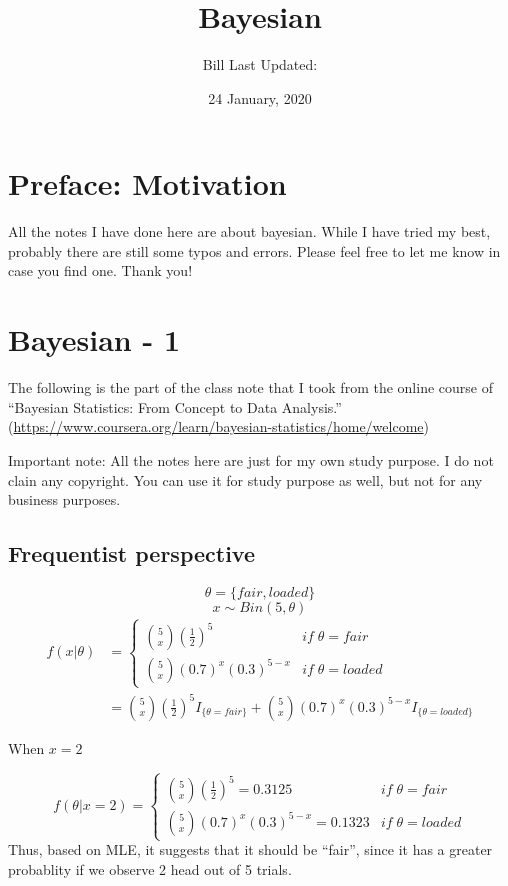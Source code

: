 \documentclass[]{book}
\title{Bayesian}
\author{Bill Last Updated:}
\date{24 January, 2020}
\begin{document}
\maketitle

{
\setcounter{tocdepth}{1}
\tableofcontents
}
\chapter*{Preface: Motivation}\label{my-section}

All the notes I have done here are about bayesian. While I have tried my
best, probably there are still some typos and errors. Please feel free
to let me know in case you find one. Thank you!

\chapter{Bayesian - 1}\label{bayesian---1}

The following is the part of the class note that I took from the online
course of ``Bayesian Statistics: From Concept to Data Analysis.''
(\url{https://www.coursera.org/learn/bayesian-statistics/home/welcome})

Important note: All the notes here are just for my own study purpose. I
do not clain any copyright. You can use it for study purpose as well,
but not for any business purposes.

\section{Frequentist perspective}\label{frequentist-perspective}

\[\theta = \{ fair , loaded \}\] \[x \sim Bin (5, \theta)\]
\[\begin{aligned} f(x|\theta) &=\begin{cases} \binom{5}{x} (\frac{1}{2})^5 & if \; \theta=fair  \\ \binom{5}{x} (0.7)^x(0.3)^{5-x} & if \;  \theta=loaded  \end{cases} \\ &= \binom{5}{x} (\frac{1}{2})^5 I_{\{\theta=fair \}}+\binom{5}{x} (0.7)^x(0.3)^{5-x}I_{\{\theta=loaded \}}\end{aligned}\]

When \(x=2\)

\[f(\theta | x=2)=\begin{cases} \binom{5}{x} (\frac{1}{2})^5 = 0.3125& if \; \theta=fair  \\ \binom{5}{x} (0.7)^x(0.3)^{5-x} = 0.1323& if \;  \theta=loaded  \end{cases}\]
Thus, based on MLE, it suggests that it should be ``fair'', since it has
a greater probablity if we observe 2 head out of 5 trials.
\end{document}
